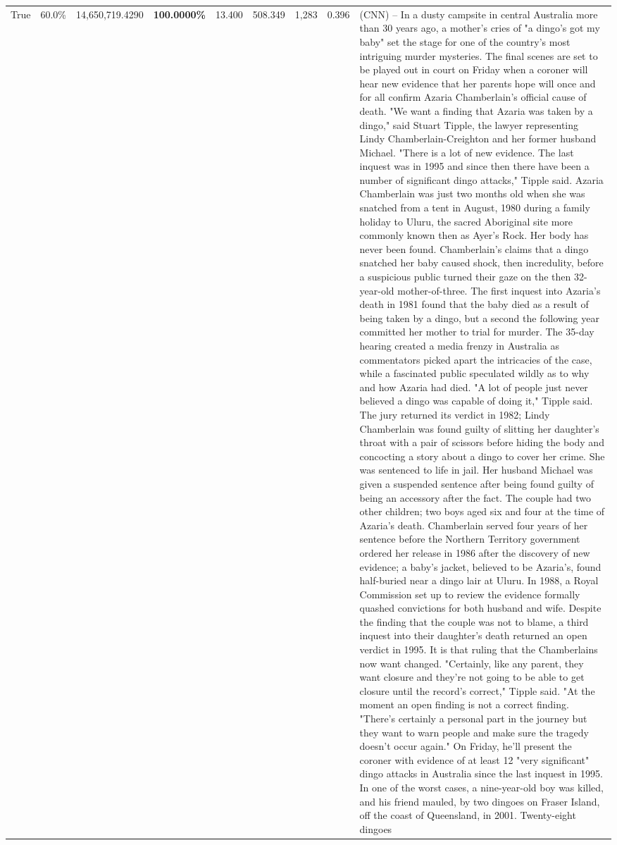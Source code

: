\begin{table}[H]
\begin{tabular}{lllrlllll}
True & 60.0\% & 14,650,719.4290 & \bfseries \color{red} 100.0000\% & 13.400 & 508.349 & 1,283 & 0.396 & (CNN) -- In a dusty campsite in central Australia more than 30 years ago, a mother's cries of "a dingo's got my baby" set the stage for one of the country's most intriguing murder mysteries. The final scenes are set to be played out in court on Friday when a coroner will hear new evidence that her parents hope will once and for all confirm Azaria Chamberlain's official cause of death. "We want a finding that Azaria was taken by a dingo," said Stuart Tipple, the lawyer representing Lindy Chamberlain-Creighton and her former husband Michael. "There is a lot of new evidence. The last inquest was in 1995 and since then there have been a number of significant dingo attacks," Tipple said. Azaria Chamberlain was just two months old when she was snatched from a tent in August, 1980 during a family holiday to Uluru, the sacred Aboriginal site more commonly known then as Ayer's Rock. Her body has never been found. Chamberlain's claims that a dingo snatched her baby caused shock, then incredulity, before a suspicious public turned their gaze on the then 32-year-old mother-of-three. The first inquest into Azaria's death in 1981 found that the baby died as a result of being taken by a dingo, but a second the following year committed her mother to trial for murder. The 35-day hearing created a media frenzy in Australia as commentators picked apart the intricacies of the case, while a fascinated public speculated wildly as to why and how Azaria had died. "A lot of people just never believed a dingo was capable of doing it," Tipple said. The jury returned its verdict in 1982; Lindy Chamberlain was found guilty of slitting her daughter's throat with a pair of scissors before hiding the body and concocting a story about a dingo to cover her crime. She was sentenced to life in jail. Her husband Michael was given a suspended sentence after being found guilty of being an accessory after the fact. The couple had two other children; two boys aged six and four at the time of Azaria's death. Chamberlain served four years of her sentence before the Northern Territory government ordered her release in 1986 after the discovery of new evidence; a baby's jacket, believed to be Azaria's, found half-buried near a dingo lair at Uluru. In 1988, a Royal Commission set up to review the evidence formally quashed convictions for both husband and wife. Despite the finding that the couple was not to blame, a third inquest into their daughter's death returned an open verdict in 1995. It is that ruling that the Chamberlains now want changed. "Certainly, like any parent, they want closure and they're not going to be able to get closure until the record's correct," Tipple said. "At the moment an open finding is not a correct finding. "There's certainly a personal part in the journey but they want to warn people and make sure the tragedy doesn't occur again." On Friday, he'll present the coroner with evidence of at least 12 "very significant" dingo attacks in Australia since the last inquest in 1995. In one of the worst cases, a nine-year-old boy was killed, and his friend mauled, by two dingoes on Fraser Island, off the coast of Queensland, in 2001. Twenty-eight dingoes 
\end{tabular}
\end{table}
